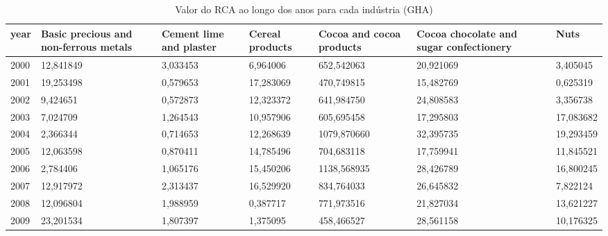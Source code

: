 \begin{table}
\centering
\caption{Valor do RCA ao longo dos anos para cada indústria (GHA)}
\begin{tabular}{p{1cm}p{2cm}p{2cm}p{2cm}p{2cm}p{2cm}p{2cm}}
\toprule
 year &  Basic precious and non-ferrous metals &  Cement lime and plaster &  Cereal products &  Cocoa and cocoa products &  Cocoa chocolate and sugar confectionery &      Nuts \\
\midrule
 2000 &                              12,841849 &                 3,033453 &         6,964006 &                652,542063 &                                20,921069 &  3,405045 \\
 2001 &                              19,253498 &                 0,579653 &        17,283069 &                470,749815 &                                15,482769 &  0,625319 \\
 2002 &                               9,424651 &                 0,572873 &        12,323372 &                641,984750 &                                24,808583 &  3,356738 \\
 2003 &                               7,024709 &                 1,264543 &        10,957906 &                605,695458 &                                17,295803 & 17,083682 \\
 2004 &                               2,366344 &                 0,714653 &        12,268639 &               1079,870660 &                                32,395735 & 19,293459 \\
 2005 &                              12,063598 &                 0,870411 &        14,785496 &                704,683118 &                                17,759941 & 11,845521 \\
 2006 &                               2,784406 &                 1,065176 &        15,450206 &               1138,568935 &                                28,426789 & 16,800245 \\
 2007 &                              12,917972 &                 2,313437 &        16,529920 &                834,764033 &                                26,645832 &  7,822124 \\
 2008 &                              12,096804 &                 1,988959 &         0,387717 &                771,973516 &                                21,827034 & 13,621227 \\
 2009 &                              23,201534 &                 1,807397 &         1,375095 &                458,466527 &                                28,561158 & 10,176325 \\

\end{tabular}
\end{table}
